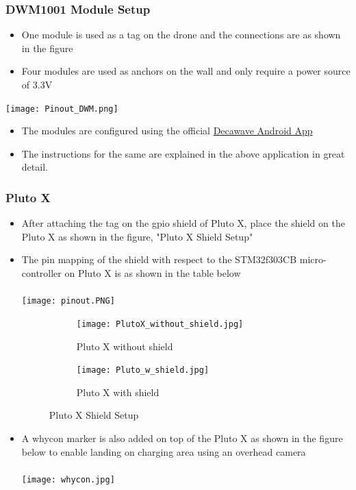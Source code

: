 \documentclass[a4paper,12pt,oneside]{book}
\begin{document}
\subsubsection*{DWM1001 Module Setup}
\begin{itemize}
  \item One module is used as a tag on the drone and the connections are as shown in the figure
  \item Four modules are used as anchors on the wall and only require a power source of 3.3V 
 \end{itemize}
\texttt{[image: Pinout\_DWM.png]}
\begin{itemize}
  \item The modules are configured using the official \href{https://play.google.com/store/apps/details?id=com.decawave.argomanager}{Decawave Android App}
  \item The instructions for the same are explained in the above application in great detail. 
 \end{itemize}

\subsubsection*{Pluto X}
\begin{itemize}
  \item After attaching the tag on the gpio shield of Pluto X, place the shield on the Pluto X as shown in the figure, "Pluto X Shield Setup"
  \item The pin mapping of the shield with respect to the STM32f303CB micro-controller on Pluto X is as shown in the table below \\ \\
  \texttt{[image: pinout.PNG]}

\begin{figure}
\centering
\begin{subfigure}{.6\textwidth}
  \centering
  \texttt{[image: PlutoX\_without\_shield.jpg]}
  \caption{Pluto X without shield}
  \label{fig:sub1}
\end{subfigure}%
\begin{subfigure}{.5\textwidth}
  \centering
  \texttt{[image: Pluto\_w\_shield.jpg]}
  \caption{Pluto X with shield}
  \label{fig:sub2}
\end{subfigure}
\caption{Pluto X Shield Setup}
\label{fig:test}
\end{figure}
\item A whycon marker is also added on top of the Pluto X as shown in the figure below to enable landing on charging area using an overhead camera \\ \\

\centering
\texttt{[image: whycon.jpg]}
\end{itemize}
\end{document}
